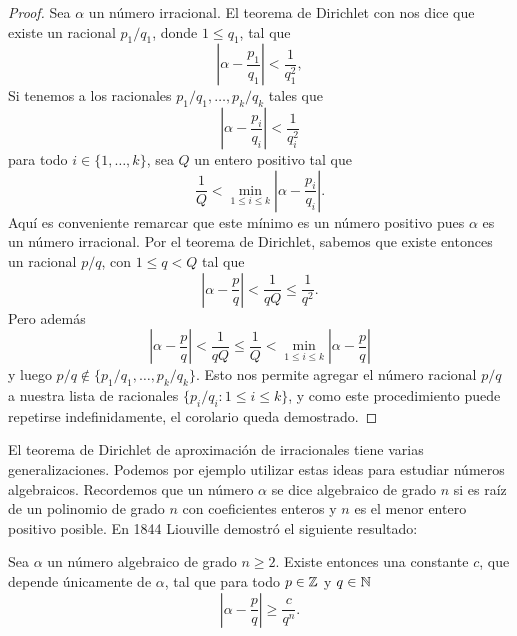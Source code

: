 \begin{proof}
	Sea $\alpha$ un número irracional.  
	El teorema de Dirichlet con nos dice que existe un racional $p_1/q_1$, donde 
	$1\leq q_1$, tal que 
	\[
		\left|\alpha-\frac{p_1}{q_1}\right|<\frac{1}{q_1^2},
	\]
	Si tenemos a los racionales $p_1/q_1,\dots,p_k/q_k$ tales que 
	\[
		\left|\alpha-\frac{p_i}{q_i}\right|<\frac{1}{q_i^2}
	\]
	para todo $i\in\{1,\dots,k\}$, sea $Q$ un entero positivo tal que 
	\[
		\frac{1}{Q}<\min_{1\leq i\leq k}\left|\alpha-\frac{p_i}{q_i}\right|.
	\]
	Aquí es conveniente remarcar que este mínimo es un número positivo pues
	$\alpha$ es un número irracional. Por el teorema de Dirichlet, sabemos que
	existe entonces un racional $p/q$, con $1\leq q<Q$ tal que 
	\[
		\left|\alpha-\frac{p}{q}\right|<\frac{1}{qQ}\leq\frac{1}{q^2}.
	\]
	Pero además 
	\[
		\left|\alpha-\frac{p}{q}\right|<\frac{1}{qQ}\leq\frac{1}{Q}<\min_{1\leq i\leq k}\left|\alpha-\frac{p}{q}\right|
	\]
	y luego $p/q\not\in\{p_1/q_1,\dots,p_k/q_k\}$. Esto nos permite agregar el
	número racional $p/q$ a nuestra lista de racionales $\{p_i/q_i:1\leq i\leq
	k\}$, y como este procedimiento puede repetirse indefinidamente, el
	corolario queda demostrado.
\end{proof}

El teorema de Dirichlet de aproximación de irracionales tiene varias
generalizaciones. Podemos por ejemplo utilizar estas ideas para estudiar
números algebraicos. Recordemos que un número $\alpha$ se dice algebraico de
grado $n$ si es raíz de un polinomio de grado $n$ con coeficientes enteros y
$n$ es el menor entero positivo posible.  En 1844 Liouville demostró el
siguiente resultado:

\begin{theorem}[Liouville]
	Sea $\alpha$ un número algebraico de grado $n\geq2$. Existe entonces una
	constante $c$, que depende únicamente de $\alpha$, tal que para todo
	$p\in\mathbb{Z}$ y $q\in\mathbb{N}$ 
	\[
		\left|\alpha-\frac{p}{q}\right|\geq \frac{c}{q^n}.
	\]
\end{theorem}

